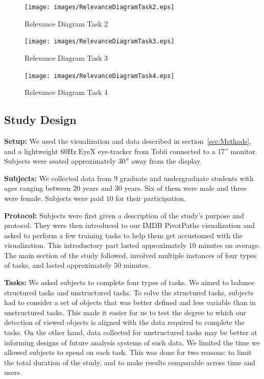 \begin{figure}[htb]
  \centering
  \texttt{[image: images/RelevanceDiagramTask2.eps]}
  \caption{Relevance Diagram Task 2}
	\label{fig:RelevanceDiagramTask2}
\end{figure}

\begin{figure}[htb]
  \centering
  \texttt{[image: images/RelevanceDiagramTask3.eps]}
  \caption{Relevance Diagram Task 3}
	\label{fig:RelevanceDiagramTask3}
\end{figure}

\begin{figure}[htb]
  \centering
  \texttt{[image: images/RelevanceDiagramTask4.eps]}
  \caption{Relevance Diagram Task 4}
	\label{fig:RelevanceDiagramTask4}
\end{figure}

\subsection{Study Design }

\textbf{Setup: } We used the visualization and data described in section~\ref{sec:Methods}, and a lightweight $60$Hz EyeX eye-tracker from Tobii connected to a 17'' monitor. Subjects were seated approximately $30''$ away from the display. 

\textbf{Subjects:} We collected data from $9$ graduate and undergraduate students with ages ranging between $20$ years and $30$ years. Six of them were male and three were female. Subjects were paid $10$ for their participation. 

\textbf{Protocol:} Subjects were first given a description of the study's purpose and protocol. They were then introduced to our IMDB PivotPaths visualization and asked to perform a few training tasks to help them get accustomed with the visualization. This introductory part lasted approximately $10$ minutes on average. The main section of the study followed, involved multiple instances of four types of tasks, and lasted approximately $50$ minutes. 


\textbf{Tasks:} We asked subjects to complete four types of tasks. We aimed to balance structured tasks and unstructured tasks. To solve the structured tasks, subjects had to consider a set of objects that was better defined and less variable than in unstructured tasks. This made it easier for us to test the degree to which our detection of viewed objects is aligned with the data required to complete the tasks. On the other hand, data collected for unstructured tasks may be better at informing designs of future analysis systems of such data. We limited the time we allowed subjects to spend on each task. This was done for two reasons: to limit the total duration of the study, and to make results comparable across time and users.

